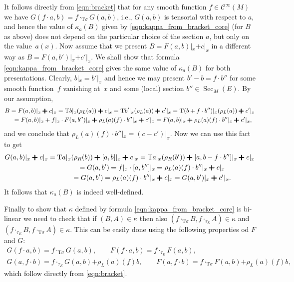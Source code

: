 \documentclass[pdftex]{sigma}
\newcommand{\Sec}{\operatorname{Sec}}
\newcommand{\plus}{\boldsymbol{\pmb{+}}}
\newcommand{\minus}{\boldsymbol{\pmb{-}}}
\newcommand{\rhoL}{\rho_L} %
\newcommand{\rhoR}{\rho_R}
\newcommand{\T}{\mathrm{T}} %
\newcommand{\Cf}{\mathcal{C}^\infty}
\numberwithin{equation}{section}
\theoremstyle{definition}
\begin{document}
It follows directly from \eqref{eqn:bracket} that for any smooth function $f\in \Cf(M)$ we have $G(f\cdot a,b)=f\cdot_{\T \sigma}G(a,b)$, i.e., $G(a,b)$ is tensorial with respect to $a$, and hence the value of $\kappa_a(B)$ given by \eqref{eqn:kappa_from_bracket_core} (for $B$ as above) does not depend on the particular choice of the section $a$, but only on the value~$a(x)$. Now assume that we present $B=F(a,b)|_x \plus c|_x$ in a different way as $B=F(a,b')|_x\plus c'|_x$. We shall show that formula \eqref{eqn:kappa_from_bracket_core} gives the same value of $\kappa_a(B)$ for both presentations. Clearly, $b|_x=b'|_x$ and hence we may present $b'-b=f\cdot b''$ for some smooth function~$f$ vanishing at~$x$ and some (local) section $b''\in\Sec_M(E)$. By our assumption,
\begin{gather*}
B =F(a,b)|_x\plus c|_x=\T b|_x(\rhoL(a))\plus c|_x=\T b'|_x(\rhoL(a))\plus c'|_x=\T(b+f\cdot b'')|_x(\rhoL(a))\plus c'|_x\\
\hphantom{B}=F(a,b)|_x+f|_x\cdot F(a,b'')|_x\plus\rhoL(a)(f)\cdot b''|_x\plus c'|_x=F(a,b)|_x\plus\rhoL(a)(f)\cdot b''|_x\plus c'|_x,
\end{gather*}
and we conclude that $\rhoL(a)(f)\cdot b''|_x=(c-c')|_x$. Now we can use this fact to get
\begin{gather*}
G(a,b)|_x\plus c|_x =\T a|_x(\rhoR(b))\plus[a,b]|_x\plus c|_x=\T a|_x(\rhoR(b'))\plus[a,b-f\cdot b'']|_x\plus c|_x\\
\hphantom{G(a,b)|_x\plus c|_x}{} =G(a,b')\minus f|_x\cdot[a,b'']|_x\minus \rhoL(a)(f)\cdot b''|_x\plus c|_x\\
\hphantom{G(a,b)|_x\plus c|_x}{} =G(a,b')\minus \rhoL(a)(f)\cdot b''|_x\plus c|_x =G(a,b')|_x\plus c'|_x.
\end{gather*}
It follows that $\kappa_a(B)$ is indeed well-defined.

Finally to show that $\kappa$ defined by formula \eqref{eqn:kappa_from_bracket_core} is bi-linear we need to check that if $(B,A)\in \kappa$ then also $(f\cdot_{\T\sigma}B,f\cdot_{\tau_E}A)\in \kappa$ and $(f\cdot_{\tau_E}B,f\cdot_{\T\sigma}A)\in \kappa$. This can be easily done using the following properties od $F$ and $G$:
\begin{gather}
G(f\cdot a,b)=f\cdot_{\T\sigma} G(a,b), \qquad F(f\cdot a,b)=f\cdot_{\tau_E} F(a,b),\nonumber\\
G(a,f\cdot b)=f\cdot_{\tau_E} G(a,b)\plus\rhoL(a)(f)b,\qquad F(a,f\cdot b)=f\cdot_{\T\sigma} F(a,b)\plus\rhoL(a)(f)b,\label{eqn:rescalling}
\end{gather}
which follow directly from \eqref{eqn:bracket}. %
\end{document}

